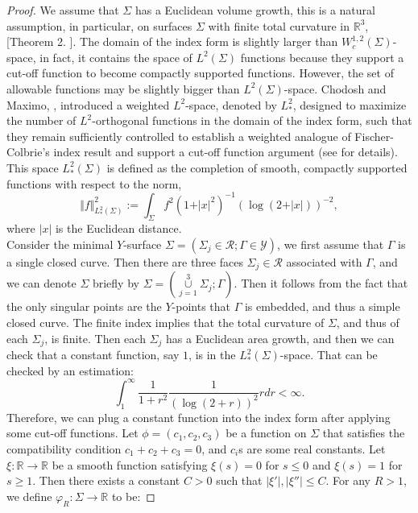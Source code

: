 \documentclass[10pt,a4paper]{amsart}
\theoremstyle{theorem}
\theoremstyle{definition}
\numberwithin{equation}{section}
\begin{document}
\begin{proof}
We assume that $\Sigma$ has a Euclidean volume growth, this is a natural assumption, in particular, on surfaces $\Sigma$ with finite total curvature in $\mathbb{R}^3$,  [Theorem 2. \cite{fischer1985complete}]. The domain of the index form is slightly larger than $W_c^{1,2}(\Sigma)$-space, in fact, it contains the space of $L^2(\Sigma)$ functions because they support a cut-off function to become compactly supported functions. However, the set of allowable functions may be slightly bigger than $L^2(\Sigma)$-space. Chodosh and Maximo, \cite{chodosh2023topology}, introduced a weighted $L^2$-space, denoted by $L_*^2$, designed to maximize the number of $L^2$-orthogonal functions in the domain of the index form, such that they remain sufficiently controlled to establish a weighted analogue of Fischer-Colbrie’s index result \cite{fischer1985complete} and support a cut-off function argument (see \cite{chodosh2023topology} for details). This space $L_*^2(\Sigma)$ is defined as the completion of smooth, compactly supported functions with respect to the norm,
$$
\Vert f\Vert_{L_*^2(\Sigma)}^{2}:=\int_{\Sigma}f^2(1+\vert x\vert^2)^{-1}(\log(2+\vert x\vert))^{-2},
$$
where $\vert x\vert$ is the Euclidean distance. \\
Consider the minimal $Y$-surface $\Sigma =(\Sigma_j\in \mathcal{R}; \Gamma \in \mathcal{Y})$, we first assume that $\Gamma$ is a single closed curve. Then there are three faces $\Sigma_j \in\mathcal{R}$ associated with $\Gamma$, and we can denote $\Sigma$ briefly by $\Sigma =(\underset{j=1}{\overset{3}{\cup }} \Sigma_j; \Gamma )$. Then it follows from the fact that the only singular points are the $Y$-points that $\Gamma$ is embedded, and thus a simple closed curve. The finite index implies that the total curvature of $\Sigma$, and thus of each $\Sigma_j$, is finite. Then each $\Sigma_j$ has a Euclidean area growth, and then we can check that a constant function, say $1$, is in the $L^2_*(\Sigma)$-space. That can be checked by an estimation:
$$
\int_1^{\infty}\frac{1}{1+r^2}\frac{1}{(\log(2+ r))^2}rdr <\infty .
$$
Therefore, we can plug a constant function into the index form after applying some cut-off functions. Let $\phi=(c_1,c_2,c_3)$ be a function on $\Sigma$ that satisfies the compatibility condition $c_1+c_2+c_3=0$, and $c_i$s are some real constants. Let $\xi :\mathbb{R}\to \mathbb{R}$ be a smooth function satisfying $\xi(s)=0$ for $s\leq 0$ and $\xi (s)=1$ for $s\geq 1$. Then there exists a constant $C>0$ such that $\vert \xi'\vert,\vert \xi''\vert\leq C$. For any $R>1$, we define $\varphi_R:\Sigma\to \mathbb{R}$ to be:

\end{proof}
\end{document}
